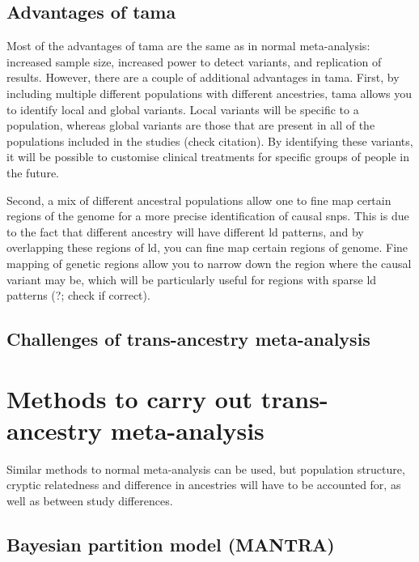 \subsection{Advantages of \gls{tama}}
\label{sub:advantages_of_tama}

Most of the advantages of \gls{tama} are the same as in normal meta-analysis: increased sample size, increased power to detect variants, and replication of results.
However, there are a couple of additional advantages in \gls{tama}.
First, by including multiple different populations with different ancestries, \gls{tama} allows you to identify local and global variants.
Local variants will be specific to a population, whereas global variants are those that are present in all of the populations included in the studies (check citation).
By identifying these variants, it will be possible to customise clinical treatments for specific groups of people in the future.

Second, a mix of different ancestral populations allow one to fine map certain regions of the genome for a more precise identification of causal \glspl{snp}.
This is due to the fact that different ancestry will have different \gls{ld} patterns, and by overlapping these regions of \gls{ld}, you can fine map certain regions of genome.
Fine mapping of genetic regions allow you to narrow down the region where the causal variant may be, which will be particularly useful for regions with sparse \gls{ld} patterns (?; check if correct).

\subsection{Challenges of trans-ancestry meta-analysis}
\label{sub:challenges_of_trans_ancestry_meta_analysis}








\section{Methods to carry out trans-ancestry meta-analysis}
\label{sec:methods_to_carry_out_trans_ancestry_meta_analysis}

Similar methods to normal meta-analysis can be used, but population structure, cryptic relatedness and difference in ancestries will have to be accounted for, as well as between study differences.

\subsection{Bayesian partition model (MANTRA)}
\label{sub:bayesian_partition_model}

